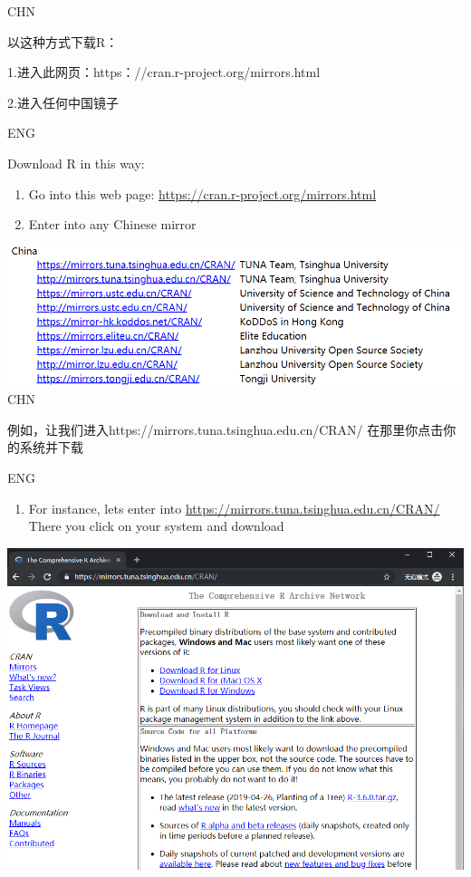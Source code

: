 \documentclass[]{book}
\providecommand{\tightlist}{%
  \setlength{\itemsep}{0pt}\setlength{\parskip}{0pt}}
\begin{document}
CHN

以这种方式下载R：

1.进入此网页：https：//cran.r-project.org/mirrors.html

2.进入任何中国镜子

ENG

Download R in this way:

\begin{enumerate}
\def\labelenumi{\arabic{enumi}.}
\tightlist
\item
  Go into this web page: \url{https://cran.r-project.org/mirrors.html}
\item
  Enter into any Chinese mirror
\end{enumerate}

\includegraphics{fig/01.png}
CHN

例如，让我们进入https://mirrors.tuna.tsinghua.edu.cn/CRAN/
在那里你点击你的系统并下载

ENG

\begin{enumerate}
\def\labelenumi{\arabic{enumi}.}
\setcounter{enumi}{2}
\tightlist
\item
  For instance, lets enter into \url{https://mirrors.tuna.tsinghua.edu.cn/CRAN/}
  There you click on your system and download
\end{enumerate}

\includegraphics{fig/02.png}
\end{document}
